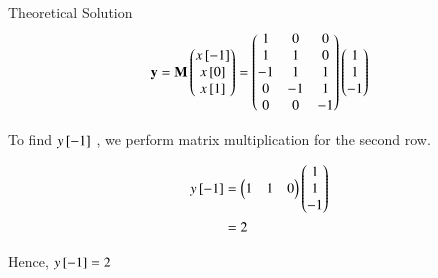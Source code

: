 \documentclass{beamer}
\begin{document}
\begin{frame}{Theoretical Solution}
\begin{align}
    \mathbf{y} = \mathbf{M}\begin{pmatrix}x{}\left[-1\right]\\x{}\left[0\right]\\x{}\left[1\right]\end{pmatrix} = \begin{pmatrix}1&0&0\\1&1&0\\-1&1&1\\0&-1&1\\0&0&-1\end{pmatrix}\begin{pmatrix}1\\1\\-1\end{pmatrix}
\end{align}

To find $y{}\left[-1\right]$ , we perform matrix multiplication for the second row.

\begin{align}
    y{}\left[-1\right] &= \begin{pmatrix}1&1&0\end{pmatrix}\begin{pmatrix}1\\1\\-1\end{pmatrix}\\
    &=2
\end{align}

Hence, $y{}\left[-1\right]= 2$
\end{frame}
\end{document}
